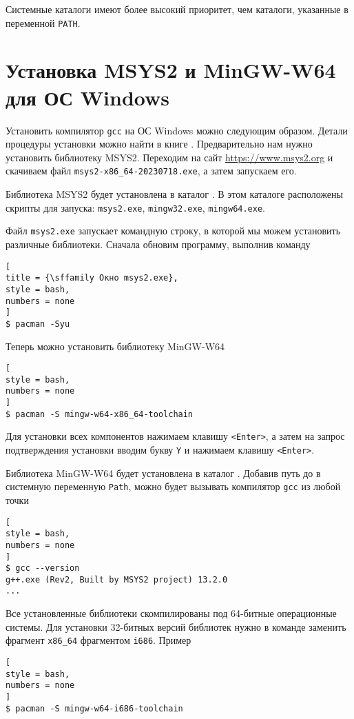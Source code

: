 \documentclass[%
	11pt,
	a4paper,
	utf8,
		]{article}
\begin{document}
Системные каталоги имеют более высокий приоритет, чем каталоги, указанные в переменной \verb*|PATH|.

\section{Установка MSYS2 и MinGW-W64 для ОС Windows}

Установить компилятор \verb|gcc| на ОС Windows можно следующим образом. Детали процедуры установки можно найти в книге \cite[]{prokhorenok-prog-c:2020}. Предварительно нам нужно установить библиотеку MSYS2. Переходим на сайт \url{https://www.msys2.org} и скачиваем файл \verb*|msys2-x86_64-20230718.exe|, а затем запускаем его.

Библиотека MSYS2 будет установлена в каталог . В этом каталоге расположены скрипты для запуска: \verb|msys2.exe|, \verb*|mingw32.exe|, \verb|mingw64.exe|.

Файл \verb*|msys2.exe| запускает командную строку, в которой мы можем установить различные библиотеки. Сначала обновим программу, выполнив команду
\begin{lstlisting}[
title = {\sffamily Окно msys2.exe},
style = bash,
numbers = none
]
$ pacman -Syu
\end{lstlisting}

Теперь можно установить библиотеку MinGW-W64
\begin{lstlisting}[
style = bash,
numbers = none
]
$ pacman -S mingw-w64-x86_64-toolchain
\end{lstlisting}

Для установки всех компонентов нажимаем клавишу \verb*|<Enter>|, а затем на запрос подтверждения установки вводим букву \verb|Y| и нажимаем клавишу \verb|<Enter>|.

Библиотека MinGW-W64 будет установлена в каталог . Добавив путь до  в системную переменную \verb*|Path|, можно будет вызывать компилятор \verb|gcc| из любой точки
\begin{lstlisting}[
style = bash,
numbers = none
]
$ gcc --version
g++.exe (Rev2, Built by MSYS2 project) 13.2.0
...
\end{lstlisting}

Все установленные библиотеки скомпилированы под 64-битные операционные системы. Для установки 32-битных версий библиотек нужно в команде заменить фрагмент \verb*|x86_64| фрагментом \verb|i686|. Пример
\begin{lstlisting}[
style = bash,
numbers = none
]
$ pacman -S mingw-w64-i686-toolchain
\end{lstlisting}
\end{document}
